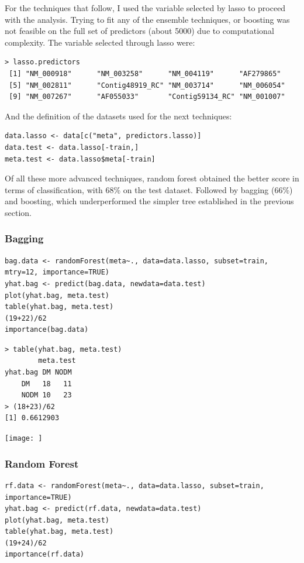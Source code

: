 \documentclass[11pt, a4paper]{article}
\begin{document}
For the techniques that follow, I used the variable selected by lasso
to proceed with the analysis. Trying to fit any of the ensemble
techniques, or boosting was not feasible on the full set of predictors
(about 5000) due to computational complexity. The variable selected
through lasso were:


\begin{verbatim}
> lasso.predictors
 [1] "NM_000918"      "NM_003258"      "NM_004119"      "AF279865"      
 [5] "NM_002811"      "Contig48919_RC" "NM_003714"      "NM_006054"     
 [9] "NM_007267"      "AF055033"       "Contig59134_RC" "NM_001007"
\end{verbatim}

And the definition of the datasets used for the next techniques:


\begin{verbatim}
data.lasso <- data[c("meta", predictors.lasso)]
data.test <- data.lasso[-train,]
meta.test <- data.lasso$meta[-train]
\end{verbatim}

Of all these more advanced techniques, random forest obtained the
better score in terms of classification, with 68\% on the test
dataset. Followed by bagging (66\%) and boosting, which underperformed
the simpler tree established in the previous section.
\subsubsection{Bagging}
\label{sec-1-2-5}


\begin{verbatim}
bag.data <- randomForest(meta~., data=data.lasso, subset=train, mtry=12, importance=TRUE)
yhat.bag <- predict(bag.data, newdata=data.test)
plot(yhat.bag, meta.test)
table(yhat.bag, meta.test)
(19+22)/62
importance(bag.data)
\end{verbatim}


\begin{verbatim}
> table(yhat.bag, meta.test)
        meta.test
yhat.bag DM NODM
    DM   18   11
    NODM 10   23
> (18+23)/62
[1] 0.6612903
\end{verbatim}

\texttt{[image: ]}
\subsubsection{Random Forest}
\label{sec-1-2-6}


\begin{verbatim}
rf.data <- randomForest(meta~., data=data.lasso, subset=train, importance=TRUE)
yhat.bag <- predict(rf.data, newdata=data.test)
plot(yhat.bag, meta.test)
table(yhat.bag, meta.test)
(19+24)/62
importance(rf.data)
\end{verbatim}
\end{document}
